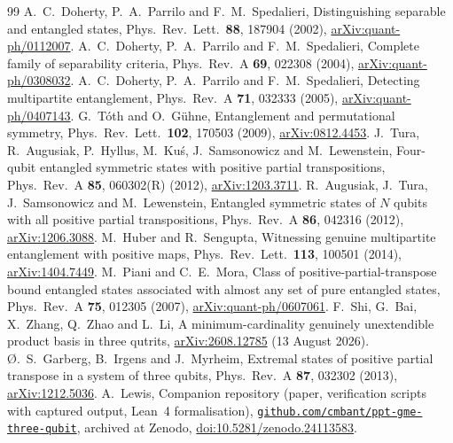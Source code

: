 \documentclass[11pt]{article}
\theoremstyle{remark}
\begin{document}
\begin{thebibliography}{99}
 A.~C.~Doherty, P.~A.~Parrilo and F.~M.~Spedalieri, Distinguishing separable and entangled states, Phys.\
Rev.\ Lett.\ \textbf{88}, 187904 (2002), \href{https://arxiv.org/abs/quant-ph/0112007}{arXiv:quant-ph/0112007}.
\bibitem{DPS} A.~C.~Doherty, P.~A.~Parrilo and F.~M.~Spedalieri, Complete family of separability criteria, Phys.\ Rev.\ A
\textbf{69}, 022308 (2004), \href{https://arxiv.org/abs/quant-ph/0308032}{arXiv:quant-ph/0308032}.
\bibitem{DPS05} A.~C.~Doherty, P.~A.~Parrilo and F.~M.~Spedalieri, Detecting multipartite entanglement, Phys.\ Rev.\ A
\textbf{71}, 032333 (2005), \href{https://arxiv.org/abs/quant-ph/0407143}{arXiv:quant-ph/0407143}.
\bibitem{TG} G.~T\'oth and O.~G\"uhne, Entanglement and permutational symmetry, Phys.\ Rev.\ Lett.\ \textbf{102}, 170503
(2009), \href{https://arxiv.org/abs/0812.4453}{arXiv:0812.4453}.
\bibitem{TAHKSL} J.~Tura, R.~Augusiak, P.~Hyllus, M.~Ku\'s, J.~Samsonowicz and M.~Lewenstein, Four-qubit entangled symmetric
states with positive partial transpositions, Phys.\ Rev.\ A \textbf{85}, 060302(R) (2012),
\href{https://arxiv.org/abs/1203.3711}{arXiv:1203.3711}.
 R.~Augusiak, J.~Tura, J.~Samsonowicz and M.~Lewenstein, Entangled symmetric states of $N$ qubits with all
positive partial transpositions, Phys.\ Rev.\ A \textbf{86}, 042316 (2012),
\href{https://arxiv.org/abs/1206.3088}{arXiv:1206.3088}.
 M.~Huber and R.~Sengupta, Witnessing genuine multipartite entanglement with positive maps, Phys.\ Rev.\ Lett.\
\textbf{113}, 100501 (2014), \href{https://arxiv.org/abs/1404.7449}{arXiv:1404.7449}.
\bibitem{PM} M.~Piani and C.~E.~Mora, Class of positive-partial-transpose bound entangled states associated with almost any
set of pure entangled states, Phys.\ Rev.\ A \textbf{75}, 012305 (2007), \href{https://arxiv.org/abs/quant-ph/0607061}{arXiv:quant-ph/0607061}.
\bibitem{SBZL} F.~Shi, G.~Bai, X.~Zhang, Q.~Zhao and L.~Li, A minimum-cardinality genuinely unextendible product basis in
three qutrits, \href{https://arxiv.org/abs/2608.12785}{arXiv:2608.12785} (13 August 2026).
\bibitem{GIM} {\O}.~S.~Garberg, B.~Irgens and J.~Myrheim, Extremal states of positive partial transpose in a system of
three qubits, Phys.\ Rev.\ A \textbf{87}, 032302 (2013), \href{https://arxiv.org/abs/1212.5036}{arXiv:1212.5036}.
\bibitem{Companion} A.~Lewis, Companion repository (paper, verification scripts with captured output, Lean~4 formalisation),
\href{https://github.com/cmbant/ppt-gme-three-qubit}{\texttt{github.com/cmbant/ppt-gme-three-qubit}},
archived at Zenodo, \href{https://doi.org/10.5281/zenodo.24113583}{doi:10.5281/zenodo.24113583}.
\end{thebibliography}
\end{document}
